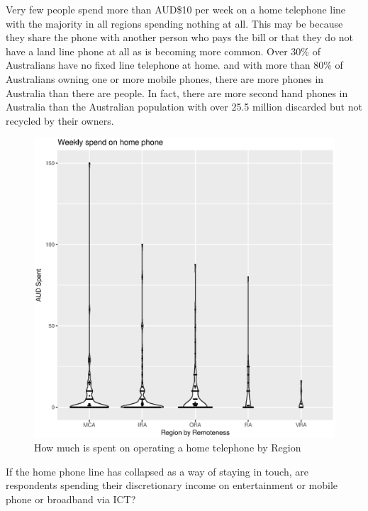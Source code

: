 Very few people spend more than AUD\$10 per week on a home telephone line with the majority in all regions spending nothing at all. This may be because they share the phone with another person who pays the bill or that they do not have a land line phone at all as is becoming more common. Over 30\% of Australians have no fixed line telephone at home.\cite[p15]{acma2016} and with more than 80\% of Australians owning one or more mobile phones, there are more phones in Australia than there are people. In fact, there are more second hand phones in Australia than the  Australian population with over 25.5 million discarded but not recycled by their owners.\cite{RefWorks:405}
\begin{figure}[ht]
\centering
\includegraphics[scale=0.5]{figures/VChart11-WeeklySpendHomePhone.eps} 
\caption{How much is spent on operating a home telephone by Region}\label{fig:VC011HomePhoneSpendRegions}
\end{figure}

If the home phone line has collapsed as a way of staying in touch, are respondents spending their discretionary income on entertainment or mobile phone or broadband via ICT?

